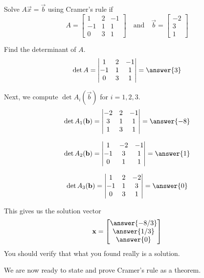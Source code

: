 \documentclass{ximera}
\begin{document}
\begin{example}\label{ex:cramer3by3}
Solve $A\vec{x}=\vec{b}$ using Cramer's rule if
$$A=\begin{bmatrix}1&2&-1\\-1&1&1\\0&3&1\end{bmatrix}\quad\text{and}\quad \vec{b}=\begin{bmatrix}-2\\3\\1\end{bmatrix}$$

\begin{explanation}
Find the determinant of $A$.
$$\det{A}=\begin{vmatrix}1&2&-1\\-1&1&1\\0&3&1\end{vmatrix}=\answer{3}$$

Next, we compute $\det{A_i(\vec{b})}$ for $i=1, 2, 3$.
$$\det{A_1(\vec{b})}=\begin{vmatrix}-2&2&-1\\3&1&1\\1&3&1\end{vmatrix}=\answer{-8}$$

$$\det{A_2(\vec{b})}=\begin{vmatrix}1&-2&-1\\-1&3&1\\0&1&1\end{vmatrix}=\answer{1}$$

$$\det{A_3(\vec{b})}=\begin{vmatrix}1&2&-2\\-1&1&3\\0&3&1\end{vmatrix}=\answer{0}$$

This gives us the solution vector
$$\vec{x}=\begin{bmatrix}\answer{-8/3}\\\answer{1/3}\\\answer{0}\end{bmatrix}$$
You should verify that what you found really is a solution.
\end{explanation}
\end{example}
We are now ready to state and prove Cramer's rule as a theorem.
\end{document}
